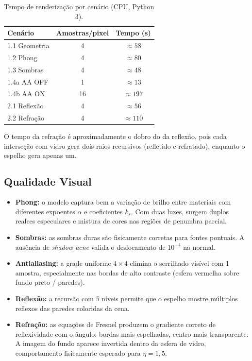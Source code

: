 \documentclass[12pt,a4paper]{article}
\begin{document}
\begin{table}[H]
  \centering
  \caption{Tempo de renderização por cenário (CPU, Python 3).}
  \label{tab:perf}
  \begin{tabular}{lcc}
    \toprule
    Cenário & Amostras/pixel & Tempo (s) \\
    \midrule
    1.1 Geometria        & 4  & $\approx 58$ \\
    1.2 Phong            & 4  & $\approx 80$ \\
    1.3 Sombras          & 4  & $\approx 48$ \\
    1.4a AA OFF          & 1  & $\approx 13$ \\
    1.4b AA ON           & 16 & $\approx 197$ \\
    2.1 Reflexão         & 4  & $\approx 56$ \\
    2.2 Refração         & 4  & $\approx 110$ \\
    \bottomrule
  \end{tabular}
\end{table}

O tempo da refração é aproximadamente o dobro do da reflexão, pois
cada interseção com vidro gera dois raios recursivos (refletido e
refratado), enquanto o espelho gera apenas um.

\subsection{Qualidade Visual}

\begin{itemize}
  \item \textbf{Phong:} o modelo captura bem a variação de brilho entre
        materiais com diferentes expoentes $\alpha$ e coeficientes $k_s$.
        Com duas luzes, surgem duplos realces especulares e mistura de
        cores nas regiões de penumbra parcial.

  \item \textbf{Sombras:} as sombras duras são fisicamente corretas para
        fontes pontuais. A ausência de \textit{shadow acne} valida o
        deslocamento de $10^{-4}$ na normal.

  \item \textbf{Antialiasing:} a grade uniforme $4\times4$ elimina o
        serrilhado visível com 1 amostra, especialmente nas bordas de
        alto contraste (esfera vermelha sobre fundo preto / paredes).

  \item \textbf{Reflexão:} a recursão com 5 níveis permite que o espelho
        mostre múltiplos reflexos das paredes coloridas da cena.

  \item \textbf{Refração:} as equações de Fresnel produzem o gradiente
        correto de reflexividade com o ângulo: bordas mais espelhadas,
        centro mais transparente. A imagem do fundo aparece invertida
        dentro da esfera de vidro, comportamento fisicamente esperado
        para $\eta = 1{,}5$.
\end{itemize}
\end{document}
